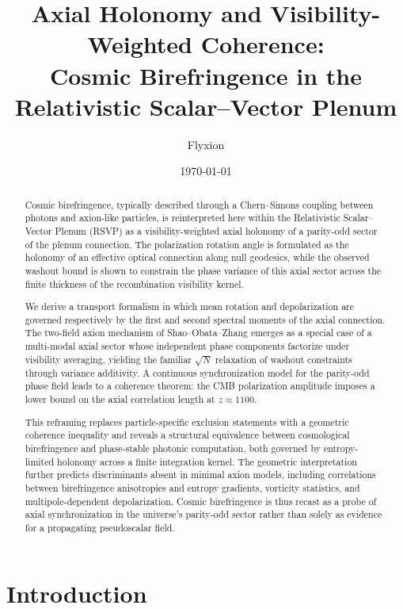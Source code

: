 \documentclass[12pt]{article}
\title{\textbf{Axial Holonomy and Visibility-Weighted Coherence: \\
Cosmic Birefringence in the Relativistic Scalar--Vector Plenum}}
\author{Flyxion}
\date{\today}
\begin{document}
\maketitle

\begin{abstract}

Cosmic birefringence, typically described through a Chern--Simons coupling between photons and axion-like particles, is reinterpreted here within the Relativistic Scalar--Vector Plenum (RSVP) as a visibility-weighted axial holonomy of a parity-odd sector of the plenum connection. The polarization rotation angle is formulated as the holonomy of an effective optical connection along null geodesics, while the observed washout bound is shown to constrain the phase variance of this axial sector across the finite thickness of the recombination visibility kernel.

We derive a transport formalism in which mean rotation and depolarization are governed respectively by the first and second spectral moments of the axial connection. The two-field axion mechanism of Shao--Obata--Zhang emerges as a special case of a multi-modal axial sector whose independent phase components factorize under visibility averaging, yielding the familiar $\sqrt{N}$ relaxation of washout constraints through variance additivity. A continuous synchronization model for the parity-odd phase field leads to a coherence theorem: the CMB polarization amplitude imposes a lower bound on the axial correlation length at $z \approx 1100$.

This reframing replaces particle-specific exclusion statements with a geometric coherence inequality and reveals a structural equivalence between cosmological birefringence and phase-stable photonic computation, both governed by entropy-limited holonomy across a finite integration kernel. The geometric interpretation further predicts discriminants absent in minimal axion models, including correlations between birefringence anisotropies and entropy gradients, vorticity statistics, and multipole-dependent depolarization. Cosmic birefringence is thus recast as a probe of axial synchronization in the universe’s parity-odd sector rather than solely as evidence for a propagating pseudoscalar field.

\end{abstract}

\newpage
\section{Introduction}
\end{document}
